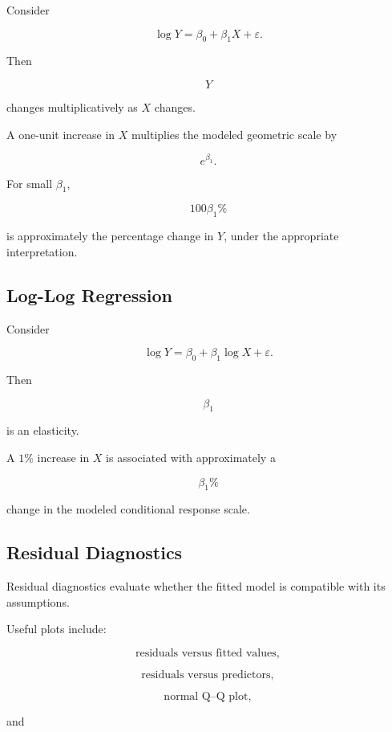 Consider

\[
\boxed{
\log Y
=
\beta_0+\beta_1X+\varepsilon.
}
\]

Then

\[
Y
\]

changes multiplicatively as \(X\) changes.

A one-unit increase in \(X\) multiplies the modeled geometric scale by

\[
\boxed{
e^{\beta_1}.
}
\]

For small \(\beta_1\),

\[
100\beta_1\%
\]

is approximately the percentage change in \(Y\), under the appropriate
interpretation.

\subsection{Log-Log Regression}
\label{subsec:log-log-regression}

Consider

\[
\boxed{
\log Y
=
\beta_0
+
\beta_1\log X
+
\varepsilon.
}
\]

Then

\[
\beta_1
\]

is an elasticity.

A \(1\%\) increase in \(X\) is associated with approximately a

\[
\boxed{
\beta_1\%
}
\]

change in the modeled conditional response scale.

\subsection{Residual Diagnostics}
\label{subsec:residual-diagnostics}

Residual diagnostics evaluate whether the fitted model is compatible with
its assumptions.

Useful plots include:

\[
\boxed{
\text{residuals versus fitted values},
}
\]

\[
\boxed{
\text{residuals versus predictors},
}
\]

\[
\boxed{
\text{normal Q--Q plot},
}
\]

and

